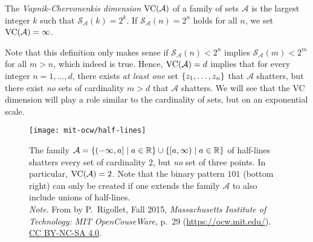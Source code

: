 \begin{definition}
The \emph{Vapnik-Chervonenkis dimension} $\operatorname{VC}(\mathcal{A})$ of a family of sets $\mathcal{A}$ is the largest integer $k$ such that $\mathcal{S}_{\mathcal{A}}(k) = 2^k$. If $\mathcal{S}_{\mathcal{A}}(n) = 2^n$ holds for all $n$, we set $\operatorname{VC}(\mathcal{A}) = \infty$.
\end{definition}

Note that this definition only makes sense if $\mathcal{S}_{\mathcal{A}}(n) < 2^n$ implies $\mathcal{S}_{\mathcal{A}}(m) < 2^m$ for all $m > n$, which indeed is true. Hence, $\operatorname{VC}(\mathcal{A}) = d$ implies that for every integer $n = 1, \dots, d$, there exists \emph{at least one} set $\set{z_1, \dots, z_n}$ that $\mathcal{A}$ shatters, but there exist \emph{no} sets of cardinality $m > d$ that $\mathcal{A}$ shatters. We will see that the VC dimension will play a role similar to the cardinality of sets, but on an exponential scale.

\begin{figure}
    \centering
    \texttt{[image: mit-ocw/half-lines]}
    \caption{%
        The family $\mathcal{A} = \set{(-\infty, a] \with a \in \R} \cup \set{[a, \infty) \with a \in \R}$ of half-lines shatters every set of cardinality $2$, but \emph{no} set of three points. In particular, $\operatorname{VC}(\mathcal{A}) = 2$. Note that the binary pattern $101$ (bottom right) can only be created if one extends the family $\mathcal{A}$ to also include unions of half-lines. \\
        \indent\emph{Note}. From  by P.~Rigollet, Fall 2015, \emph{Massachusetts Institute of Technology: MIT OpenCouseWare}, p.~29 (\url{https://ocw.mit.edu/}). \href{https://creativecommons.org/licenses/by-nc-sa/4.0/}{CC BY-NC-SA 4.0}.
    }
    \label{fig: VC dimension of half-lines}
\end{figure}

